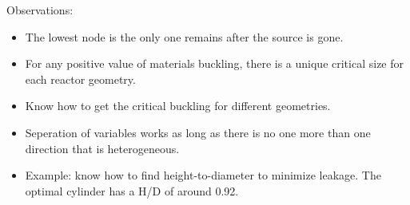 \documentclass{school-22.211-notes}
\begin{document}
\clearpage
{}
\begin{table}[ht]
  \small
  \caption{One Group Fundamental Mode Eigenvalues and Eigenvectors} \label{eigen-values}
\end{table}
\normalsize

Observations:
\begin{itemize}
\item The lowest node is the only one remains after the source is gone. 
\item For any positive value of materials buckling, there is a unique critical size for each reactor geometry. 
\item Know how to get the critical buckling for different geometries. 
\item Seperation of variables works as long as there is no one more than one direction that is heterogeneous. 
\item Example: know how to find height-to-diameter to minimize leakage. The optimal cylinder has a H/D of around 0.92. 
\end{itemize}
\end{document}
